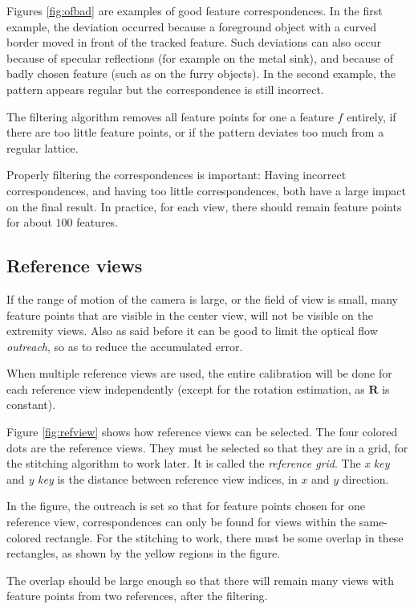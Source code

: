 \documentclass{scrreprt}
\newcommand{\matr}[1]{\mathbf{#1}}
\begin{document}
Figures \ref{fig:ofbad} are examples of good feature correspondences. In the first example, the deviation occurred because a foreground object with a curved border moved in front of the tracked feature. Such deviations can also occur because of specular reflections (for example on the metal sink), and because of badly chosen feature (such as on the furry objects). In the second example, the pattern appears regular but the correspondence is still incorrect.

The filtering algorithm removes all feature points for one a feature $f$ entirely, if there are too little feature points, or if the pattern deviates too much from a regular lattice.

Properly filtering the correspondences is important: Having incorrect correspondences, and having too little correspondences, both have a large impact on the final result. In practice, for each view, there should remain feature points for about $100$ features.



\subsection{Reference views}
\label{sec:refviews}
If the range of motion of the camera is large, or the field of view is small, many feature points that are visible in the center view, will not be visible on the extremity views. Also as said before it can be good to limit the optical flow \emph{outreach}, so as to reduce the accumulated error.

When multiple reference views are used, the entire calibration will be done for each reference view independently (except for the rotation estimation, as $\matr{R}$ is constant).

Figure \ref{fig:refview} shows how reference views can be selected. The four colored dots are the reference views. They must be selected so that they are in a grid, for the stitching algorithm to work later. It is called the \emph{reference grid}. The \emph{x key} and \emph{y key} is the distance between reference view indices, in $x$ and $y$ direction.

In the figure, the outreach is set so that for feature points chosen for one reference view, correspondences can only be found for views within the same-colored rectangle. For the stitching to work, there must be some overlap in these rectangles, as shown by the yellow regions in the figure. 

The overlap should be large enough so that there will remain many views with feature points from two references, after the filtering.
\end{document}
